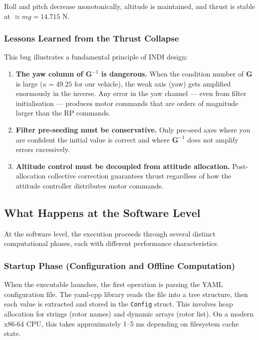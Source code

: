 \documentclass[12pt, a4paper]{article}
\begin{document}
Roll and pitch decrease monotonically, altitude is maintained, and thrust is stable at $\approx mg = 14.715$ N.

\subsubsection{Lessons Learned from the Thrust Collapse}

This bug illustrates a fundamental principle of INDI design:

\begin{enumerate}
    \item \textbf{The yaw column of $\bm{G}^{-1}$ is dangerous.}  When the condition number of $\bm{G}$ is large ($\kappa = 49.25$ for our vehicle), the weak axis (yaw) gets amplified enormously in the inverse.  Any error in the yaw channel --- even from filter initialisation --- produces motor commands that are orders of magnitude larger than the RP commands.

    \item \textbf{Filter pre-seeding must be conservative.}  Only pre-seed axes where you are confident the initial value is correct and where $\bm{G}^{-1}$ does not amplify errors excessively.

    \item \textbf{Altitude control must be decoupled from attitude allocation.}  Post-allocation collective correction guarantees thrust regardless of how the attitude controller distributes motor commands.
\end{enumerate}

\subsection{What Happens at the Software Level}

At the software level, the execution proceeds through several distinct computational phases, each with different performance characteristics.

\subsubsection{Startup Phase (Configuration and Offline Computation)}

When the executable launches, the first operation is parsing the YAML configuration file.  The yaml-cpp library reads the file into a tree structure, then each value is extracted and stored in the \texttt{Config} struct.  This involves heap allocation for strings (rotor names) and dynamic arrays (rotor list).  On a modern x86-64 CPU, this takes approximately 1--5 ms depending on filesystem cache state.
\end{document}
